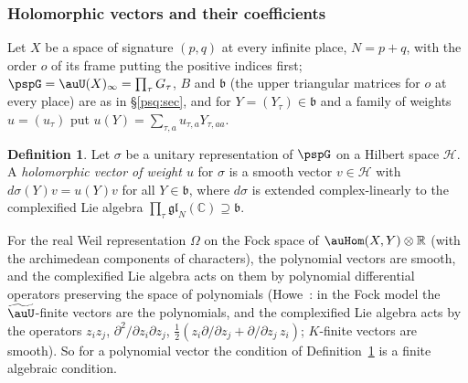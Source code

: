 \documentclass[10pt]{amsart}
\theoremstyle{definition}
\newtheorem{definition}[theorem]{Definition}
\theoremstyle{remark}
\newcommand{\C}{\mathbb C}
\newcommand{\R}{\mathbb R}
\begin{document}
\subsubsection{Holomorphic vectors and their coefficients}\label{psr:ss-hol}

Let $X$ be a space of signature $(p,q)$ at every infinite place, $N=p+q$, with the order $o$ of its
frame putting the positive indices first; $\pspG=\auU(X)_\infty=\prod_\tau G_\tau$, $B$ and $\mathfrak b$
(the upper triangular matrices for $o$ at every place) are as in \S\ref{psq:sec}, and for
$Y=(Y_\tau)\in\mathfrak b$ and a family of weights $u=(u_\tau)$ put $u(Y)=\sum_{\tau,a}u_{\tau,a}
Y_{\tau,aa}$.

\begin{definition}\label{psr:def-hol}
Let $\sigma$ be a unitary representation of $\pspG$ on a Hilbert space $\mathcal H$. A
\emph{holomorphic vector of weight $u$} for $\sigma$ is a smooth vector $v\in\mathcal H$ with
$d\sigma(Y)v=u(Y)v$ for all $Y\in\mathfrak b$, where $d\sigma$ is extended complex-linearly to the
complexified Lie algebra $\prod_\tau\mathfrak{gl}_N(\C)\supseteq\mathfrak b$.
\end{definition}

\noindent For the real Weil representation $\Omega$ on the Fock space of $\auHom(X,Y)\otimes\R$
(with the archimedean components of characters), the polynomial vectors are smooth, and the
complexified Lie algebra acts on them by polynomial differential operators preserving the space of
polynomials (Howe~\cite[(2.2)--(2.3)]{HoweJAMS}: in the Fock model the $\widetilde{\auU}$-finite vectors are the polynomials, and the complexified Lie algebra acts by the operators $z_iz_j$, $\partial^2/\partial z_i\partial z_j$, $\frac12(z_i\partial/\partial z_j+\partial/\partial z_j\, z_i)$; $K$-finite vectors are smooth). So for a polynomial vector
the condition of Definition~\ref{psr:def-hol} is a finite algebraic condition.
\end{document}
